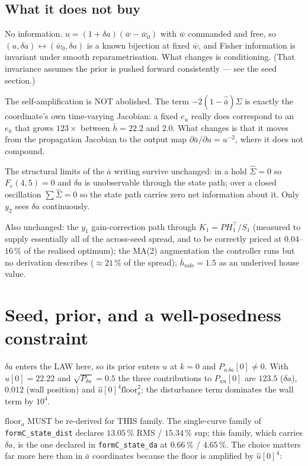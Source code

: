 \documentclass[11pt,a4paper,fontset=none]{ctexart}
\newcommand{\ba}{\bar{a}}
\newcommand{\bw}{\bar{w}}
\begin{document}
\subsection*{What it does not buy}

No information. $u = (1+\delta a)(\bw-\bw_0)$ with $\bw$ commanded and free, so
$(u,\delta a) \leftrightarrow (\bw_0,\delta a)$ is a known bijection at fixed
$\bw$, and Fisher information is invariant under smooth reparametrisation. What
changes is conditioning. (That invariance assumes the prior is pushed forward
consistently --- see the seed section.)

The self-amplification is NOT abolished. The term $-2(1-\hat{\ba})\Sigma$ is
exactly the coordinate's own time-varying Jacobian: a fixed $e_u$ really does
correspond to an $e_{\ba}$ that grows $123\times$ between $\bar h = 22.2$ and
$2.0$. What changes is that it moves from the propagation Jacobian to the
output map $\partial\ba/\partial u = u^{-2}$, where it does not compound.

The structural limits of the $\ba$ writing survive unchanged: in a hold
$\hat{\Sigma} = 0$ so $F_e(4,5) = 0$ and $\delta a$ is unobservable through the
state path; over a closed oscillation $\sum\hat{\Sigma} = 0$ so the state path
carries zero net information about it. Only $y_2$ sees $\delta a$ continuously.

Also unchanged: the $y_1$ gain-correction path through $K_1 = PH_1^{\top}/S_1$
(measured to supply essentially all of the across-seed spread, and to be
correctly priced at $0.04$--$16\,\%$ of the realised optimum); the MA(2)
augmentation the controller runs but no derivation describes ($\approx 21\,\%$
of the spread); $\bar h_{\mathrm{safe}} = 1.5$ as an underived house value.

\section*{Seed, prior, and a well-posedness constraint}

$\delta a$ enters the LAW here, so its prior enters $u$ at $k=0$ and
$P_{u\,\delta a}[0] \neq 0$. With $\hat u[0] = 22.22$ and $\sqrt{P_{\delta a}} =
0.5$ the three contributions to $P_{uu}[0]$ are $123.5$ ($\delta a$), $0.012$
(wall position) and $\hat u[0]^{4}\mathrm{floor}_a^{2}$; the disturbance term
dominates the wall term by $10^{4}$.

$\mathrm{floor}_a$ MUST be re-derived for THIS family. The single-curve family
of \texttt{formC\_state\_dist} declares $13.05\,\%$ RMS / $15.34\,\%$ sup; this
family, which carries $\delta a$, is the one declared in
\texttt{formC\_state\_da} at $0.66\,\%$ / $4.65\,\%$. The choice matters far
more here than in $\ba$ coordinates because the floor is amplified by
$\hat u[0]^{4}$:
\end{document}

